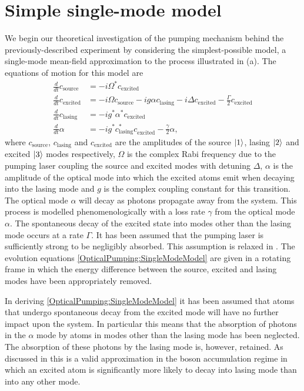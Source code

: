 \section{Simple single-mode model}
\label{OpticalPumping:SingleModeModel}

We begin our theoretical investigation of the pumping mechanism behind the previously-described experiment by considering the simplest-possible model, a single-mode mean-field approximation to the process illustrated in (a).  The equations of motion for this model are
\begin{subequations}
    \label{OpticalPumping:SingleModeModel}
    \begin{align}
        \frac{d}{dt} c_\text{source} &= -i \Omega^* c_\text{excited} \\
        \frac{d }{dt}c_\text{excited} &= -i \Omega c_\text{source} -i g \alpha c_\text{lasing} - i \Delta c_\text{excited} - \frac{\Gamma}{2} c_\text{excited}\\
        \frac{d }{dt}c_\text{lasing} &= -i g^* \alpha^* c_\text{excited} \\
        \frac{d }{dt}\alpha &= -i g^* c_\text{lasing}^* c_\text{excited}^{\phantom{*}} - \frac{\gamma}{2} \alpha,
    \end{align} 
\end{subequations}
where $c_\text{source}$, $c_\text{lasing}$ and $c_\text{excited}$ are the amplitudes of the source ${\left|1\right>}$, lasing ${\left|2\right>}$ and excited ${\left|3\right>}$ modes respectively, $\Omega$ is the complex Rabi frequency due to the pumping laser coupling the source and excited modes with detuning $\Delta$, $\alpha$ is the amplitude of the optical mode into which the excited atoms emit when decaying into the lasing mode and $g$ is the complex coupling constant for this transition.  The optical mode $\alpha$ will decay as photons propagate away from the system.  This process is modelled phenomenologically with a loss rate $\gamma$ from the optical mode $\alpha$.  The spontaneous decay of the excited state into modes other than the lasing mode occurs at a rate $\Gamma$.  It has been assumed that the pumping laser is sufficiently strong to be negligibly absorbed.  This assumption is relaxed in .  The evolution equations \eqref{OpticalPumping:SingleModeModel} are given in a rotating frame in which the energy difference between the source, excited and lasing modes have been appropriately removed.

In deriving \eqref{OpticalPumping:SingleModeModel} it has been assumed that atoms that undergo spontaneous decay from the excited mode will have no further impact upon the system.  In particular this means that the absorption of photons in the $\alpha$ mode by atoms in modes other than the lasing mode has been neglected.  The absorption of these photons by the lasing mode is, however, retained.  As discussed in  this is a valid approximation in the boson accumulation regime in which an excited atom is significantly more likely to decay into lasing mode than into any other mode.


